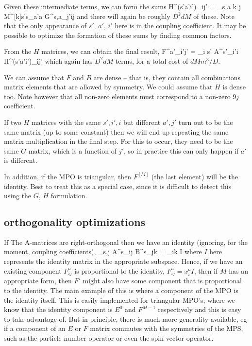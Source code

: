 \documentclass{article}[10pt]
\begin{document}
Given these intermediate terms, we can form the sums
\beq
H^{(s'a'i')}_{ij'} = \sum_{s a k j}
 \:
M^{[k]s's}_{a'a}
G^{s,a}_{j'ij}
\eeq
and there will again be roughly $D^2 dM$ of these.
Note that the only appearance of $s'$, $a'$, $i'$ here is in the coupling coefficient.
It may be possible to optimize the formation of these sums by finding common factors.

From the $H$ matrices, we can obtain the final result,
\beq
F^{a'}_{i'j'} = \sum_{i s'} A^{s'}_{i'i} H^{(s'a'i')}_{ij'}
\eeq
which again has $D^2 dM$ terms, for a total cost of $d M m^3 / D$.

We can assume that $F$ and $B$ are dense -- that is, they contain all combinations matrix elements that are allowed
by symmetry. We could assume that $H$ is dense too. Note however that all non-zero elements must correspond
to a non-zero $9j$ coefficient.

If two $H$ matrices with the same $s',i',i$ but different $a',j'$ turn out to be the same matrix (up to
some constant) then we will end up repeating the same matrix multiplication in the final step.
For this to occur, they need to be the same $G$ matrix, which is a function of $j'$, so in practice
this can only happen if $a'$ is different.

In addition, if the MPO is triangular, then $F^{[M]}$ (the last element) will be the identity. Best to treat this
as a special case, since it is difficult to detect this using the $G$, $H$ formulation.


\subsection{orthogonality optimizations}

If The A-matrices are right-orthogonal then we have an identity (ignoring, for the moment, coupling coefficients),
\beq
\sum_{s,j} A^{s}_{ij} B^{\dagger s}_{jk} = \delta_{ik} \; I
\label{eq:ConstantPart}
\eeq
where $I$ here represents the identity matrix in the appropriate subspace.
Hence, if we have an existing component $F^{a}_{ij}$ is proportional to the identity,
$F^{a}_{ij} = x^a_i I$, then if $M$ has an appropriate form, then $F'$ might also have some component that is
proportional to the identity. The main example of this is where a component of the MPO is the identity itself.
This is easily implemented for triangular MPO's, where we know that the identity component is $E^0$ and $F^{M-1}$
respectively and this is easy to take advantage of. But in principle, there is much more generality available,
eg if a component of an $E$ or $F$ matrix commutes with the symmetries of the MPS, such as the particle number
operator or even the spin vector operator.
\end{document}
